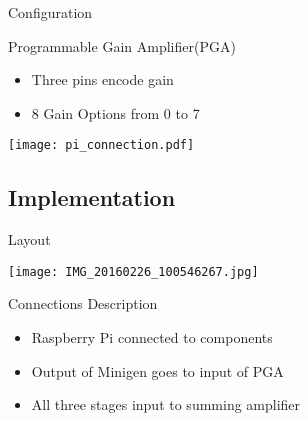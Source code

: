 \begin{frame}{Configuration}
  \begin{block}{Programmable Gain Amplifier(PGA)}
  \begin{itemize}
    \item Three pins encode gain
    \item 8 Gain Options from 0 to 7
  \end{itemize}
  \end{block}




  \begin{center}
  \texttt{[image: pi\_connection.pdf]}
  \end{center}

\end{frame}

\subsection{Implementation}

\begin{frame}{Layout}
  \begin{center}
  \texttt{[image: IMG\_20160226\_100546267.jpg]}
  \end{center}

  \begin{block}{Connections Description}
  \begin{itemize}
    \item Raspberry Pi connected to components
    \item Output of Minigen goes to input of PGA
    \item All three stages input to summing amplifier
  \end{itemize}
  \end{block}
\end{frame}

